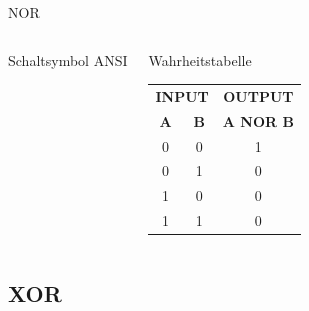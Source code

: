 \begin{frame}{NOR}
\begin{columns}
    {\small Schaltsymbol ANSI}
    \begin{block}{Wahrheitstabelle}
      \begin{tabular}{cc|c}
        \multicolumn{2}{c|}{\textbf{INPUT}} & \textbf{OUTPUT} \\
        \textbf{A} & \textbf{B} & \textbf{A NOR B} \\ \hline
        0 & 0 & 1 \\
        0 & 1 & 0 \\
        1 & 0 & 0 \\
        1 & 1 & 0 \\
      \end{tabular}
    \end{block}
  \end{columns}
\end{frame}

\subsection{XOR}

